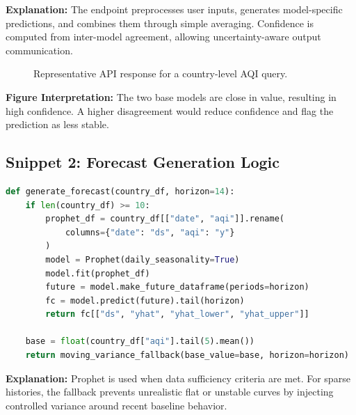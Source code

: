 \documentclass[12pt,a4paper]{article}
\begin{document}
\noindent\textbf{Explanation:} The endpoint preprocesses user inputs, generates model-specific predictions, and combines them through simple averaging. Confidence is computed from inter-model agreement, allowing uncertainty-aware output communication.

\begin{figure}[H]
\centering
{}
\caption{Representative API response for a country-level AQI query.}
\label{fig:pred-output}
\end{figure}

\noindent\textbf{Figure Interpretation:} The two base models are close in value, resulting in high confidence. A higher disagreement would reduce confidence and flag the prediction as less stable.

\subsection{Snippet 2: Forecast Generation Logic}
\begin{lstlisting}[style=papercode,language=Python,caption={Simplified 14-day forecasting logic with fallback}]
def generate_forecast(country_df, horizon=14):
    if len(country_df) >= 10:
        prophet_df = country_df[["date", "aqi"]].rename(
            columns={"date": "ds", "aqi": "y"}
        )
        model = Prophet(daily_seasonality=True)
        model.fit(prophet_df)
        future = model.make_future_dataframe(periods=horizon)
        fc = model.predict(future).tail(horizon)
        return fc[["ds", "yhat", "yhat_lower", "yhat_upper"]]

    base = float(country_df["aqi"].tail(5).mean())
    return moving_variance_fallback(base_value=base, horizon=horizon)
\end{lstlisting}

\noindent\textbf{Explanation:} Prophet is used when data sufficiency criteria are met. For sparse histories, the fallback prevents unrealistic flat or unstable curves by injecting controlled variance around recent baseline behavior.
\end{document}
